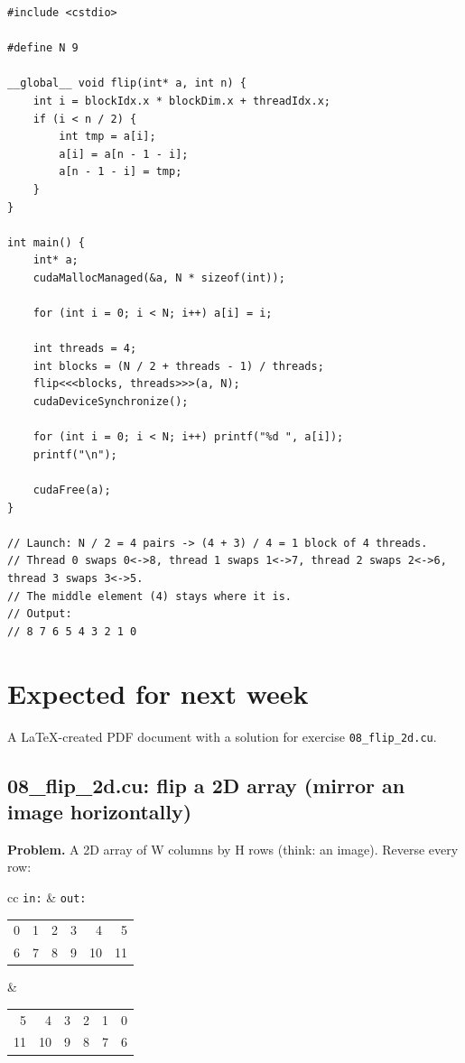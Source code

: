 \documentclass[11pt,a4paper]{article}
\begin{document}
\begin{lstlisting}[language=CUDA]
#include <cstdio>

#define N 9

__global__ void flip(int* a, int n) {
    int i = blockIdx.x * blockDim.x + threadIdx.x;
    if (i < n / 2) {
        int tmp = a[i];
        a[i] = a[n - 1 - i];
        a[n - 1 - i] = tmp;
    }
}

int main() {
    int* a;
    cudaMallocManaged(&a, N * sizeof(int));

    for (int i = 0; i < N; i++) a[i] = i;

    int threads = 4;
    int blocks = (N / 2 + threads - 1) / threads;
    flip<<<blocks, threads>>>(a, N);
    cudaDeviceSynchronize();

    for (int i = 0; i < N; i++) printf("%d ", a[i]);
    printf("\n");

    cudaFree(a);
}

// Launch: N / 2 = 4 pairs -> (4 + 3) / 4 = 1 block of 4 threads.
// Thread 0 swaps 0<->8, thread 1 swaps 1<->7, thread 2 swaps 2<->6, thread 3 swaps 3<->5.
// The middle element (4) stays where it is.
// Output:
// 8 7 6 5 4 3 2 1 0
\end{lstlisting}

\section{Expected for next week}

A \LaTeX-created PDF document with a solution for exercise \texttt{08\_flip\_2d.cu}.

\subsection{08\_flip\_2d.cu: flip a 2D array (mirror an image horizontally)}

\textbf{Problem.} A 2D array of W columns by H rows (think: an image). Reverse every row:

\begin{center}
\begin{tabular}{cc}
\texttt{in:} & \texttt{out:}\\
\begin{tabular}{rrrrrr} 0&1&2&3&4&5\\ 6&7&8&9&10&11 \end{tabular} &
\begin{tabular}{rrrrrr} 5&4&3&2&1&0\\ 11&10&9&8&7&6 \end{tabular}
\end{tabular}
\end{center}
\end{document}

